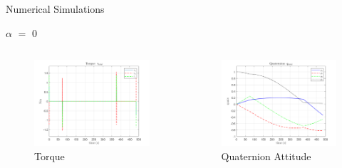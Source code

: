 \documentclass{beamer}
\begin{document}
\begin{frame}{Numerical Simulations}
	\begin{block}{$\alpha$ $=$ 0}
		
		\begin{columns}
			\begin{column}{0.5\textwidth}
				\begin{figure}[H]
					\label{fig:torque_total_alpha0}
					\begin{center}
						\includegraphics[width=2.25in]{figures/alpha0/torque.png}
					\end{center}
					\caption{Torque}
				\end{figure}
			\end{column}
		
		
			\begin{column}{0.5\textwidth}
				\begin{figure}[H]
					\label{fig:quats_phi_total_alpha0}
					\begin{center}
						\includegraphics[width=2.25in]{figures/alpha0/quats.png}
					\end{center}
					\caption{Quaternion Attitude}
				\end{figure}
			\end{column}
		\end{columns}
		
	\end{block}
\end{frame}
\end{document}
